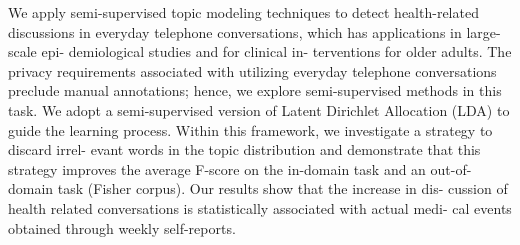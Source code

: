 We apply semi-supervised topic modeling techniques to detect health-related discussions in everyday telephone conversations, which has applications in large-scale epi- demiological studies and for clinical in- terventions for older adults. The privacy requirements associated with utilizing everyday telephone conversations preclude manual annotations; hence, we explore semi-supervised methods in this task. We adopt a semi-supervised version of Latent Dirichlet Allocation (LDA) to guide the learning process. Within this framework, we investigate a strategy to discard irrel- evant words in the topic distribution and demonstrate that this strategy improves the average F-score on the in-domain task and an out-of-domain task (Fisher corpus). Our results show that the increase in dis- cussion of health related conversations is statistically associated with actual medi- cal events obtained through weekly self-reports.
